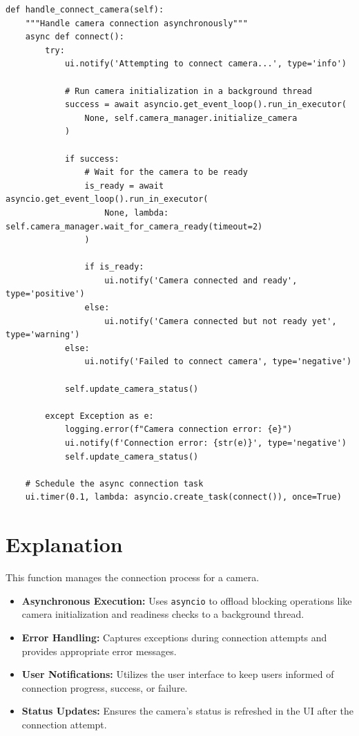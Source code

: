 \begin{verbatim}
def handle_connect_camera(self):
    """Handle camera connection asynchronously"""
    async def connect():
        try:
            ui.notify('Attempting to connect camera...', type='info')
            
            # Run camera initialization in a background thread
            success = await asyncio.get_event_loop().run_in_executor(
                None, self.camera_manager.initialize_camera
            )
            
            if success:
                # Wait for the camera to be ready
                is_ready = await asyncio.get_event_loop().run_in_executor(
                    None, lambda: self.camera_manager.wait_for_camera_ready(timeout=2)
                )
                
                if is_ready:
                    ui.notify('Camera connected and ready', type='positive')
                else:
                    ui.notify('Camera connected but not ready yet', type='warning')
            else:
                ui.notify('Failed to connect camera', type='negative')

            self.update_camera_status()

        except Exception as e:
            logging.error(f"Camera connection error: {e}")
            ui.notify(f'Connection error: {str(e)}', type='negative')
            self.update_camera_status()

    # Schedule the async connection task
    ui.timer(0.1, lambda: asyncio.create_task(connect()), once=True)
\end{verbatim}

\section*{Explanation}
This function manages the connection process for a camera.
\begin{itemize}
    \item \textbf{Asynchronous Execution:} Uses \texttt{asyncio} to offload blocking operations like camera initialization and readiness checks to a background thread.
    \item \textbf{Error Handling:} Captures exceptions during connection attempts and provides appropriate error messages.
    \item \textbf{User Notifications:} Utilizes the user interface to keep users informed of connection progress, success, or failure.
    \item \textbf{Status Updates:} Ensures the camera's status is refreshed in the UI after the connection attempt.
\end{itemize}

